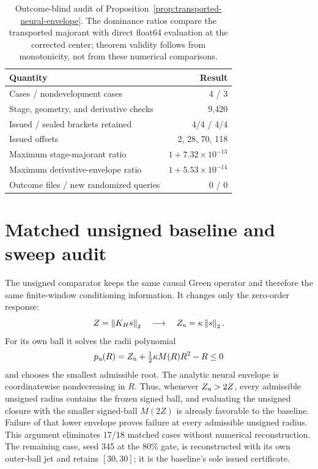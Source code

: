 \documentclass{article}
\newcommand{\norm}[1]{\left\lVert #1\right\rVert_2}
\begin{document}
\begin{table}[H]
\caption{Outcome-blind audit of Proposition~\ref{prop:transported-neural-envelope}.
The dominance ratios compare the transported majorant with direct float64
evaluation at the corrected center; theorem validity follows from monotonicity,
not from these numerical comparisons.}
\label{tab:transported-envelope-audit}
\centering
\small
\setlength{\tabcolsep}{8pt}
\begin{tabular}{lr}
\toprule
Quantity & Result \\
\midrule
Cases / nondevelopment cases & 4 / 3 \\
Stage, geometry, and derivative checks & 9,420 \\
Issued / sealed brackets retained & 4/4 / 4/4 \\
Issued offsets & 2, 28, 70, 118 \\
Maximum stage-majorant ratio & $1+7.32\times10^{-13}$ \\
Maximum derivative-envelope ratio & $1+5.53\times10^{-14}$ \\
Outcome files / new randomized queries & 0 / 0 \\
\bottomrule
\end{tabular}
\end{table}

\section{Matched unsigned baseline and sweep audit}
\label{app:mechanism}

The unsigned comparator keeps the same causal Green operator and therefore the
same finite-window conditioning information.  It changes only the zero-order
response:
\begin{equation}
 Z=\norm{K_Hs}
 \quad\longrightarrow\quad
 Z_{\rm u}=\kappa\norm{s}.
\end{equation}
For its own ball it solves the radii polynomial
\begin{equation}
 p_{\rm u}(R)=Z_{\rm u}+\tfrac12\kappa M(R)R^2-R\le0
\end{equation}
and chooses the smallest admissible root.  The analytic neural envelope is
coordinatewise nondecreasing in $R$.  Thus, whenever
$Z_{\rm u}>2Z$, every admissible unsigned radius contains the frozen signed
ball, and evaluating the unsigned closure with the smaller signed-ball
$M(2Z)$ is already favorable to the baseline.  Failure of that lower envelope
proves failure at every admissible unsigned radius.  This argument eliminates
17/18 matched cases without numerical reconstruction.  The remaining case,
seed 345 at the 80\% gate, is reconstructed with its own outer-ball jet and
retains $[30,30]$; it is the baseline's sole issued certificate.
\end{document}
